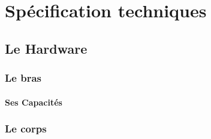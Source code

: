 \chapter{Spécification techniques}

\section{Le Hardware}

\subsection{Le bras}

\subsubsection{Ses Capacités}

\subsection{Le corps}
